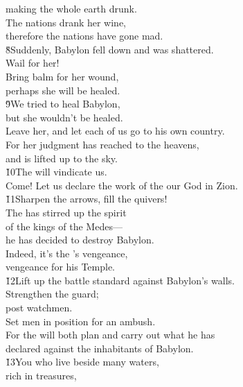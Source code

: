 \begin{poetry}
\poemll    making the whole earth drunk. \\
\poeml The nations drank her wine, \\
\poemll    therefore the nations have gone mad. \\
\poeml \v{8}Suddenly, Babylon fell down and was shattered. \\
\poemll    Wail for her! \\
\poeml Bring balm for her wound, \\
\poemll    perhaps she will be healed. \\
\poeml \v{9}We tried to heal Babylon, \\
\poemll    but she wouldn't be healed. \\
\poeml Leave her, and let each of us go to his own country. \\
\poemll    For her judgment has reached to the heavens, \\
\poemlll       and is lifted up to the sky. \\
\poeml \v{10}The  will vindicate us. \\
\poemll    Come! Let us declare the work of the  our God in Zion. \\
\poeml \v{11}Sharpen the arrows, fill the quivers! \\
\poeml The  has stirred up the spirit \\
\poemll    of the kings of the Medes--- \\
\poemlll       he has decided to destroy Babylon. \\
\poeml Indeed, it's the 's vengeance, \\
\poemll    vengeance for his Temple. \\
\poeml \v{12}Lift up the battle standard against Babylon's walls. \\
\poemll    Strengthen the guard; \\
\poemlll       post watchmen. \\
\poeml Set men in position for an ambush. \\
\poemll    For the  will both plan and carry out what he has \\
\poemlll       declared against the inhabitants of Babylon. \\
\poeml \v{13}You who live beside many waters, \\
\poemll    rich in treasures, \\

\end{poetry}
